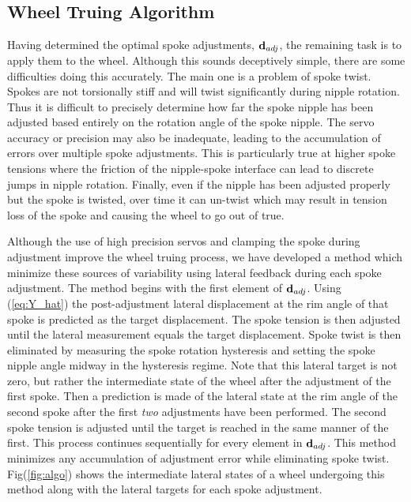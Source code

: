\documentclass[journal]{IEEEtran}
\begin{document}
\subsection{Wheel Truing Algorithm}
Having determined the optimal spoke adjustments, ${\bf d}_{adj}$, the remaining task is to apply them to the wheel. Although this sounds deceptively simple, there are some difficulties doing this accurately.  The main one is a problem of spoke twist. Spokes are not torsionally stiff and will twist significantly during nipple rotation.  Thus it is difficult to precisely determine how far the spoke nipple has been adjusted based entirely on the rotation angle of the spoke nipple. The servo accuracy or precision may also be inadequate, leading to the accumulation of errors over multiple spoke adjustments. This is particularly true at higher spoke tensions where the friction of the nipple-spoke interface can lead to discrete jumps in nipple rotation. Finally, even if the nipple has been adjusted properly but the spoke is twisted, over time it can un-twist which may result in tension loss of the spoke and causing the wheel to go out of true. 

Although the use of high precision servos and clamping the spoke during adjustment improve the wheel truing process,  we have developed a method which minimize these sources of variability using lateral feedback during each spoke adjustment. The method begins with the first element of ${\bf d}_{adj}$. Using (\ref{eq:Y_hat}) the post-adjustment lateral displacement at the rim angle of that spoke is predicted as the target displacement.  The spoke tension is then adjusted until the lateral measurement equals the target displacement. Spoke twist is then eliminated by measuring the spoke rotation hysteresis and setting the spoke nipple angle midway in the hysteresis regime. Note that this lateral target is not zero, but rather the intermediate state of the wheel after the adjustment of the first spoke.  Then a prediction is made of the lateral state at the rim angle of the second spoke after the first \emph{two} adjustments have been performed.  The second spoke tension is adjusted until the target is reached in the same manner of the first. This process continues sequentially for every element in ${\bf d}_{adj}$. This method minimizes any accumulation of adjustment error while eliminating spoke twist.  Fig(\ref{fig:algo}) shows the intermediate lateral states of a wheel undergoing this method along with the lateral targets for each spoke adjustment. 
\end{document}
